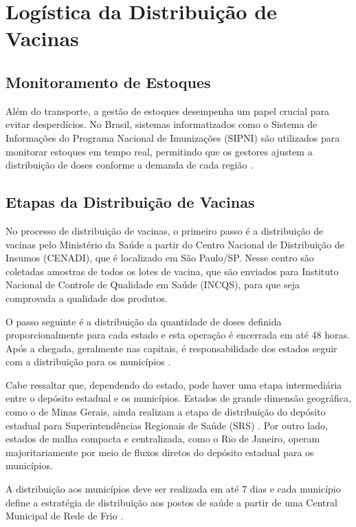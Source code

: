 \chapter{Logística da Distribuição de Vacinas}

\section{Monitoramento de Estoques}
Além do transporte, a gestão de estoques desempenha um papel crucial para evitar desperdícios. No Brasil, sistemas informatizados como o Sistema de Informações do Programa Nacional de Imunizações (SIPNI) são utilizados para monitorar estoques em tempo real, permitindo que os gestores ajustem a distribuição de doses conforme a demanda de cada região \cite{frazzon:2024}.

\section{Etapas da Distribuição de Vacinas}
No processo de distribuição de vacinas, o primeiro passo é a distribuição de vacinas pelo Ministério da Saúde a partir do Centro Nacional de Distribuição de Insumos (CENADI), que é localizado em  São Paulo/SP. Nesse centro são coletadas amostras de todos os lotes de vacina, que são enviados para Instituto Nacional de Controle de Qualidade em Saúde (INCQS), para que seja 
comprovada a qualidade dos produtos.

O passo seguinte é a distribuição da quantidade de doses definida proporcionalmente para cada estado e esta operação é encerrada em até 48 horas. Após a chegada, geralmente nas capitais, é responsabilidade dos estados seguir com a distribuição para os municípios \cite{comprovei:2024}.

Cabe ressaltar que, dependendo do estado, pode haver uma etapa intermediária entre o depósito estadual e os municípios. Estados de grande dimensão geográfica, como o de Minas Gerais, ainda realizam a etapa de distribuição do depósito estadual para Superintendências Regionais de Saúde (SRS) \cite{LimaEtAl:2019}. Por outro lado, estados de malha compacta e centralizada, como o Rio de Janeiro, operam majoritariamente por meio de fluxos diretos do depósito estadual para os municípios.

A distribuição aos municípios deve ser realizada em até 7 dias e cada município define a estratégia de distribuição aos postos de saúde a partir de uma Central Municipal de Rede de Frio \cite{canalgov:2021}.

